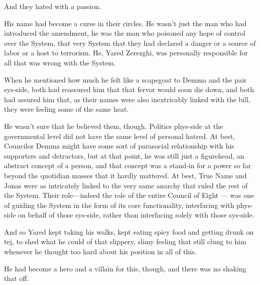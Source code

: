 And they hated with a passion.

His name had become a curse in their circles. He wasn't just the man who had introduced the amendment, he was the man who poisoned any hope of control over the System, that very System that they had declared a danger or a source of labor or a host to terrorism. He, Yared Zerezghi, was personally responsible for all that was wrong with the System.

When he mentioned how much he felt like a scapegoat to Demma and the pair sys-side, both had reassured him that that fervor would soon die down, and both had assured him that, as their names were also inextricably linked with the bill, they were feeling some of the same heat.

He wasn't sure that he believed them, though. Politics phys-side at the governmental level did not have the same level of personal hatred. At best, Councilor Demma might have some sort of parasocial relationship with his supporters and detractors, but at that point, he was still just a figurehead, an abstract concept of a person, and that concept was a stand-in for a power so far beyond the quotidian masses that it hardly mattered. At best, True Name and Jonas were as intricately linked to the very same anarchy that ruled the rest of the System. Their role---indeed the role of the entire Council of Eight — was one of guiding the System in the form of its core functionality, interfacing with phys-side on behalf of those sys-side, rather than interfacing solely with those sys-side.

And so Yared kept taking his walks, kept eating spicy food and getting drunk on tej, to shed what he could of that slippery, slimy feeling that still clung to him whenever he thought too hard about his position in all of this.

He had become a hero and a villain for this, though, and there was no shaking that off.

